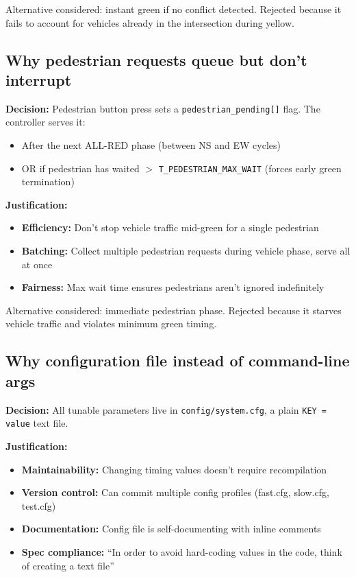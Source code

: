 \documentclass[11pt,a4paper]{article}
\begin{document}
Alternative considered: instant green if no conflict detected. Rejected because it fails to account for vehicles already in the intersection during yellow.

\subsection{Why pedestrian requests queue but don't interrupt}

\textbf{Decision:} Pedestrian button press sets a \texttt{pedestrian\_pending[]} flag. The controller serves it:
\begin{itemize}[noitemsep]
    \item After the next ALL-RED phase (between NS and EW cycles)
    \item OR if pedestrian has waited $>$ \texttt{T\_PEDESTRIAN\_MAX\_WAIT} (forces early green termination)
\end{itemize}

\textbf{Justification:}
\begin{itemize}[noitemsep]
    \item \textbf{Efficiency:} Don't stop vehicle traffic mid-green for a single pedestrian
    \item \textbf{Batching:} Collect multiple pedestrian requests during vehicle phase, serve all at once
    \item \textbf{Fairness:} Max wait time ensures pedestrians aren't ignored indefinitely
\end{itemize}

Alternative considered: immediate pedestrian phase. Rejected because it starves vehicle traffic and violates minimum green timing.

\subsection{Why configuration file instead of command-line args}

\textbf{Decision:} All tunable parameters live in \texttt{config/system.cfg}, a plain \texttt{KEY = value} text file.

\textbf{Justification:}
\begin{itemize}[noitemsep]
    \item \textbf{Maintainability:} Changing timing values doesn't require recompilation
    \item \textbf{Version control:} Can commit multiple config profiles (fast.cfg, slow.cfg, test.cfg)
    \item \textbf{Documentation:} Config file is self-documenting with inline comments
    \item \textbf{Spec compliance:} ``In order to avoid hard-coding values in the code, think of creating a text file''
\end{itemize}
\end{document}
